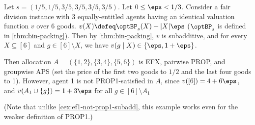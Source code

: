 \begin{example}
\label{cex:gaps-not-prop1-subadd}
Let $s = (1/5, 1/5, 3/5, 3/5, 3/5, 3/5)$. Let $0 \le \eps < 1/3$.
Consider a fair division instance with 3 equally-entitled agents
having an identical valuation function $v$ over 6 goods.
$v(X) \defeq \optBP_s(X) + |X|\eps$
($\optBP_s$ is defined in \cref{thm:bin-packing}).
Then by \cref{thm:bin-packing}, $v$ is subadditive,
and for every $X \subseteq [6]$ and $g \in [6] \setminus X$,
we have $v(g \mid X) \in \{\eps, 1+\eps\}$.

Then allocation $A = (\{1, 2\}, \{3, 4\}, \{5, 6\})$ is EFX, pairwise PROP, and groupwise APS
(set the price of the first two goods to $1/2$ and the last four goods to 1).
However, agent 1 is not PROP1-satisfied in $A$, since $v([6]) = 4 + 6\eps$,
and $v(A_1 \cup \{g\}) = 1 + 3\eps$ for all $g \in [6] \setminus A_1$

(Note that unlike \cref{cex:ef1-not-prop1-subadd}, this example
works even for the weaker definition of PROP1.)
\end{example}

